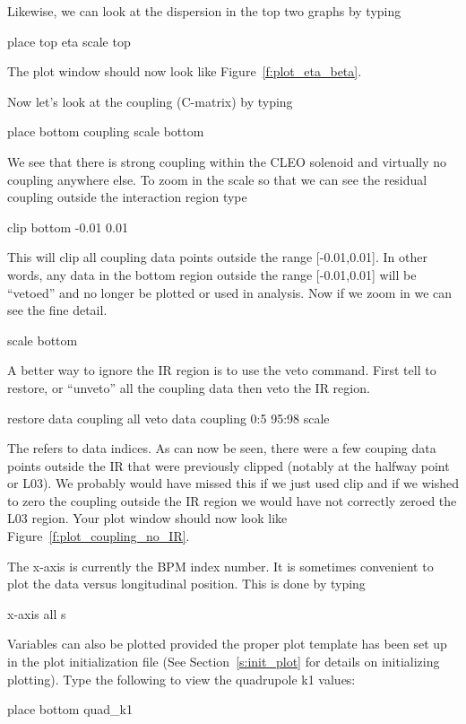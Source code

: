 Likewise, we can look at the dispersion in the top two graphs by typing
\begin{example}
  place top eta
  scale top
\end{example}
The plot window should now look like Figure~\ref{f:plot_eta_beta}.

Now let's look at the coupling (C-matrix) by typing
\begin{example}
  place bottom coupling
  scale bottom
\end{example}
We see that there is strong coupling within the CLEO solenoid and virtually no
coupling anywhere else. To zoom in the scale so that we can see the residual
coupling outside the interaction region type
\begin{example}
  clip bottom -0.01 0.01
\end{example}
This will clip all coupling data points outside the range [-0.01,0.01].
In other words, any data in the bottom region outside the range [-0.01,0.01]
will be ``vetoed'' and no longer be plotted or used in analysis.
Now if we zoom in we can see the fine detail.
\begin{example}
  scale bottom
\end{example}
A better way to ignore the IR region is to use the veto command. First tell \tao
to restore, or ``unveto'' all the coupling data then veto the IR region.
\begin{example}
  restore data coupling all
  veto data coupling 0:5 95:98
  scale
\end{example}
The  refers to data indices. As can now be seen, there were a few
couping data points outside the IR that were previously clipped (notably at the
halfway point or L03). We probably would have missed this if we just used clip
and if we wished to zero the coupling outside the IR region we would have not
correctly zeroed the L03 region.  Your plot window should now look like
Figure~\ref{f:plot_coupling_no_IR}.

The x-axis is currently the BPM index number. It is sometimes convenient to plot
the data versus longitudinal position. This is done by typing
\begin{example}
  x-axis all s
\end{example}

Variables can also be plotted provided the proper plot template has been set up
in the plot initialization file (See Section~\ref{s:init_plot} for details on
initializing plotting). Type the following to view the quadrupole k1 values:
\begin{example}
  place bottom quad_k1
\end{example}

